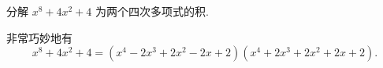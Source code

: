 \begin{prob}
\label{prob:prob-3}
分解 $x^8 + 4x^2 + 4$ 为两个四次多项式的积.
\end{prob}

\begin{soln}
非常巧妙地有
\[
x^8 + 4x^2 + 4 = (x^4 - 2x^3 + 2x^2 - 2x + 2)(x^4 + 2x^3 + 2x^2 + 2x + 2).
\]
\end{soln}

